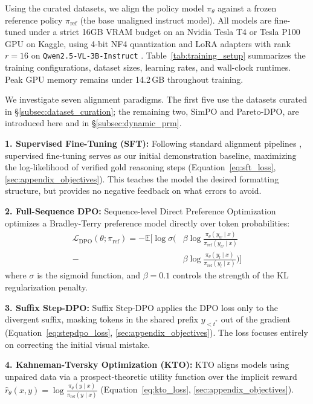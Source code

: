 \documentclass[11pt]{article}
\begin{document}
Using the curated datasets, we align the policy model $\pi_\theta$ against a frozen reference policy $\pi_{\text{ref}}$ (the base unaligned instruct model). All models are fine-tuned under a strict 16GB VRAM budget on an Nvidia Tesla T4 or Tesla P100 GPU on Kaggle, using 4-bit NF4 quantization \citep{dettmers2023qlora} and LoRA adapters \citep{hu2021lora} with rank $r=16$ on \texttt{Qwen2.5-VL-3B-Instruct} \citep{bai2025qwen25vl}. Table~\ref{tab:training_setup} summarizes the training configurations, dataset sizes, learning rates, and wall-clock runtimes. Peak GPU memory remains under 14.2\,GB throughout training.

We investigate seven alignment paradigms. The first five use the datasets curated in \S\ref{subsec:dataset_curation}; the remaining two, SimPO and Pareto-DPO, are introduced here and in \S\ref{subsec:dynamic_prm}.

\textbf{1. Supervised Fine-Tuning (SFT):} Following standard alignment pipelines \citep{ouyang2022instructgpt}, supervised fine-tuning serves as our initial demonstration baseline, maximizing the log-likelihood of verified gold reasoning steps (Equation~\ref{eq:sft_loss}, \ref{sec:appendix_objectives}). This teaches the model the desired formatting structure, but provides no negative feedback on what errors to avoid.

\textbf{2. Full-Sequence DPO:} Sequence-level Direct Preference Optimization \citep{rafailov2023dpo} optimizes a Bradley-Terry preference model directly over token probabilities:
\begin{align}
    \mathcal{L}_{\text{DPO}}(\theta; \pi_{\text{ref}}) = -\mathbb{E} \Big[ \log \sigma \Big( & \beta \log \frac{\pi_\theta(y_w \mid x)}{\pi_{\text{ref}}(y_w \mid x)} \nonumber \\
    {} - & \beta \log \frac{\pi_\theta(y_l \mid x)}{\pi_{\text{ref}}(y_l \mid x)} \Big) \Big]
    \label{eq:dpo_loss}
\end{align}
where $\sigma$ is the sigmoid function, and $\beta = 0.1$ controls the strength of the KL regularization penalty.

\textbf{3. Suffix Step-DPO:} Suffix Step-DPO \citep{lai2024stepdpo} applies the DPO loss only to the divergent suffix, masking tokens in the shared prefix $y_{<t^*}$ out of the gradient (Equation~\ref{eq:stepdpo_loss}, \ref{sec:appendix_objectives}). The loss focuses entirely on correcting the initial visual mistake.

\textbf{4. Kahneman-Tversky Optimization (KTO):} KTO \citep{ethayarajh2024kto} aligns models using unpaired data via a prospect-theoretic utility function over the implicit reward $\hat{r}_\theta(x, y) = \log \frac{\pi_\theta(y \mid x)}{\pi_{\text{ref}}(y \mid x)}$ (Equation~\ref{eq:kto_loss}, \ref{sec:appendix_objectives}).
\end{document}

